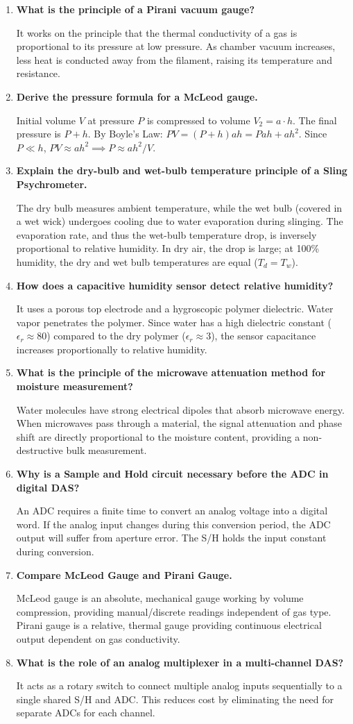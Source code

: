 \documentclass[12pt,a4paper]{article}
\newcommand{\Q}[1]{\textbf{#1}\par\noindent\ignorespaces}
\begin{document}
\begin{tcolorbox}[exambox, title={\textbf{Frequently Asked / Viva Questions}}]
\begin{enumerate}[topsep=0pt, label=\textbf{Q\arabic*.}, itemsep=5pt]
  \item \Q{What is the principle of a Pirani vacuum gauge?}
    It works on the principle that the thermal conductivity of a gas is proportional to its pressure at low pressure. As chamber vacuum increases, less heat is conducted away from the filament, raising its temperature and resistance.
  \item \Q{Derive the pressure formula for a McLeod gauge.}
    Initial volume $V$ at pressure $P$ is compressed to volume $V_2 = a \cdot h$. The final pressure is $P + h$. By Boyle's Law: $P V = (P + h) a h = P a h + a h^2$. Since $P \ll h$, $P V \approx a h^2 \implies P \approx a h^2 / V$.
  \item \Q{Explain the dry-bulb and wet-bulb temperature principle of a Sling Psychrometer.}
    The dry bulb measures ambient temperature, while the wet bulb (covered in a wet wick) undergoes cooling due to water evaporation during slinging. The evaporation rate, and thus the wet-bulb temperature drop, is inversely proportional to relative humidity. In dry air, the drop is large; at 100\% humidity, the dry and wet bulb temperatures are equal ($T_d = T_w$).
  \item \Q{How does a capacitive humidity sensor detect relative humidity?}
    It uses a porous top electrode and a hygroscopic polymer dielectric. Water vapor penetrates the polymer. Since water has a high dielectric constant ($\epsilon_r \approx 80$) compared to the dry polymer ($\epsilon_r \approx 3$), the sensor capacitance increases proportionally to relative humidity.
  \item \Q{What is the principle of the microwave attenuation method for moisture measurement?}
    Water molecules have strong electrical dipoles that absorb microwave energy. When microwaves pass through a material, the signal attenuation and phase shift are directly proportional to the moisture content, providing a non-destructive bulk measurement.
  \item \Q{Why is a Sample and Hold circuit necessary before the ADC in digital DAS?}
    An ADC requires a finite time to convert an analog voltage into a digital word. If the analog input changes during this conversion period, the ADC output will suffer from aperture error. The S/H holds the input constant during conversion.
  \item \Q{Compare McLeod Gauge and Pirani Gauge.}
    McLeod gauge is an absolute, mechanical gauge working by volume compression, providing manual/discrete readings independent of gas type. Pirani gauge is a relative, thermal gauge providing continuous electrical output dependent on gas conductivity.
  \item \Q{What is the role of an analog multiplexer in a multi-channel DAS?}
    It acts as a rotary switch to connect multiple analog inputs sequentially to a single shared S/H and ADC. This reduces cost by eliminating the need for separate ADCs for each channel.
\end{enumerate}
\end{tcolorbox}
\end{document}
